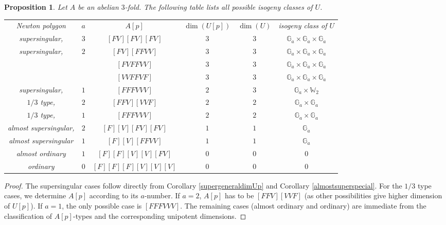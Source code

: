 \documentclass[a4paper,12pt,twoside]{report}
\newtheorem{proposition}[theorem]{Proposition}
\newcommand{\G}{\mathbb{G}}
\newcommand{\W}{\mathbb{W}}
\begin{document}
\begin{proposition}\label{NPPabe3table}
    Let $A$ be an abelian $3$-fold. The following table lists all possible isogeny classes of $U$.
    \begin{small}
    \begin{center}{\rm
    \begin{tabular}{ c|c|c|c|c|c } \label{Table2}
    Newton polygon &    $a$      & $A[p]$           & $\dim(U[p])$& $\dim(U)$ & isogeny class of $U$\\ 
    supersingular, &    $3$      &  $[FV][FV][FV]$  &  $3$       & $3$      & $\G_a\times \G_a\times \G_a$  \\ 
    supersingular, &    $2$      & $[FV][FFVV]$     &  $3$       & $3$     & $\G_a\times \G_a\times \G_a$\\    
                   &             & $[FVFFVV]$       &  $3$       & $3$     & $\G_a\times \G_a\times \G_a$\\    
                   &             & $[VVFFVF]$       &  $3$       & $3$     & $\G_a\times \G_a\times \G_a$\\    
    supersingular, &    $1$      & $[FFFVVV]$       &  $2$       & $3$     & $\G_a\times \W_2$\\            
    $1/3$ type,    &    $2$      &  $[FFV][VVF]$    &  $2$       & $2$     & $\G_a\times \G_a$  \\ 
    $1/3$ type,    &    $1$      & $[FFFVVV]$       &  $2$       & $2$     & $\G_a\times \G_a$\\                 
    almost supersingular,& $2$   & $[F][V][FV][FV]$ &  $1$       & $1$     & $\G_a$  \\ 
    almost supersingular & $1$   & $[F][V][FFVV]$   &  $1$       & $1$     & $\G_a$\\           
     almost ordinary   & $1$   & $[F][F][V][V][FV]$ &  $0$       & $0$     & $0$  \\ 
     ordinary      &    $0$   & $[F][F][F][V][V][V]$&  $0$       & $0$     & $0$\\           
    \end{tabular}}
\end{center}
    \end{small} 
\end{proposition}

\begin{proof}
    The supersingular cases follow directly from Corollary \ref{supergeneraldimUp} and Corollary \ref{almostsuperspecial}. 
    For the $1/3$ type cases, we determine $A[p]$ according to its $a$-number. 
    If $a=2$, $A[p]$ has to be $[FFV][VVF]$ (as other possibilities give higher dimension of $U[p]$). 
    If $a=1$, the only possible case is $[FFFVVV]$. 
    The remaining cases (almost ordinary and ordinary) are immediate from the classification of 
    \( A[p] \)-types and the corresponding unipotent dimensions. 
\end{proof}
\end{document}
